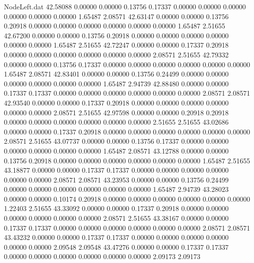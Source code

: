 \begin{filecontents}{NodeLeft.dat}
  42.58088    0.00000    0.00000     0.13756    0.17337    0.00000    0.00000    0.00000    0.00000    0.00000    0.00000    1.65487    2.08571
  42.63147    0.00000    0.00000     0.13756    0.20918    0.00000    0.00000    0.00000    0.00000    0.00000    0.00000    1.65487    2.51655
  42.67200    0.00000    0.00000     0.13756    0.20918    0.00000    0.00000    0.00000    0.00000    0.00000    0.00000    1.65487    2.51655
  42.72247    0.00000    0.00000     0.17337    0.20918    0.00000    0.00000    0.00000    0.00000    0.00000    0.00000    2.08571    2.51655
  42.79332    0.00000    0.00000     0.13756    0.17337    0.00000    0.00000    0.00000    0.00000    0.00000    0.00000    1.65487    2.08571
  42.83401    0.00000    0.00000     0.13756    0.24499    0.00000    0.00000    0.00000    0.00000    0.00000    0.00000    1.65487    2.94739
  42.88480    0.00000    0.00000     0.17337    0.17337    0.00000    0.00000    0.00000    0.00000    0.00000    0.00000    2.08571    2.08571
  42.93540    0.00000    0.00000     0.17337    0.20918    0.00000    0.00000    0.00000    0.00000    0.00000    0.00000    2.08571    2.51655
  42.97598    0.00000    0.00000     0.20918    0.20918    0.00000    0.00000    0.00000    0.00000    0.00000    0.00000    2.51655    2.51655
  43.02686    0.00000    0.00000     0.17337    0.20918    0.00000    0.00000    0.00000    0.00000    0.00000    0.00000    2.08571    2.51655
  43.07737    0.00000    0.00000     0.13756    0.17337    0.00000    0.00000    0.00000    0.00000    0.00000    0.00000    1.65487    2.08571
  43.12788    0.00000    0.00000     0.13756    0.20918    0.00000    0.00000    0.00000    0.00000    0.00000    0.00000    1.65487    2.51655
  43.18877    0.00000    0.00000     0.17337    0.17337    0.00000    0.00000    0.00000    0.00000    0.00000    0.00000    2.08571    2.08571
  43.23953    0.00000    0.00000     0.13756    0.24499    0.00000    0.00000    0.00000    0.00000    0.00000    0.00000    1.65487    2.94739
  43.28023    0.00000    0.00000     0.10174    0.20918    0.00000    0.00000    0.00000    0.00000    0.00000    0.00000    1.22403    2.51655
  43.33092    0.00000    0.00000     0.17337    0.20918    0.00000    0.00000    0.00000    0.00000    0.00000    0.00000    2.08571    2.51655
  43.38167    0.00000    0.00000     0.17337    0.17337    0.00000    0.00000    0.00000    0.00000    0.00000    0.00000    2.08571    2.08571
  43.43232    0.00000    0.00000     0.17337    0.17337    0.00000    0.00000    0.00000    0.00000    0.00000    0.00000    2.09548    2.09548
  43.47276    0.00000    0.00000     0.17337    0.17337    0.00000    0.00000    0.00000    0.00000    0.00000    0.00000    2.09173    2.09173

\end{filecontents}
